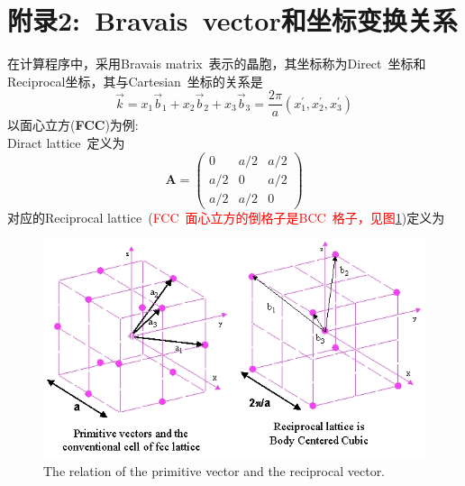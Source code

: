 \documentclass{article}      %
\begin{document}
\section{附录2:~\rm{Bravais~vector}和坐标变换关系}
在计算程序中，采用\textrm{Bravais matrix~}表示的晶胞，其坐标称为\textrm{Direct~}坐标和\textrm{Reciprocal}坐标，其与\textrm{Cartesian~}坐标的关系是
\begin{displaymath}
	\vec k=x_1\vec b_1+x_2\vec b_2+x_3\vec b_3=\frac{2\pi}a(x_1^{\prime},x_2^{\prime},x_3^{\prime})
\end{displaymath}
以面心立方(\textbf{FCC})为例:~\\
\textrm{Diract lattice~}定义为
\begin{displaymath}
	\mathbf{A}=\left(
	\begin{matrix}
		0 &a/2 &a/2\\
		a/2 &0 &a/2\\
		a/2 &a/2 &0
	\end{matrix}\right)
\end{displaymath}
对应的\textrm{Reciprocal lattice~}(\textcolor{red}{\textrm{FCC~}面心立方的倒格子是\textrm{BCC~}格子，见图\ref{Fig:primitive_reciprocal}})定义为
\begin{figure}[h!]
\centering
\includegraphics{Direct-Reciprocal_vector-FCC.png}
\caption{\small The relation of the primitive vector and the reciprocal vector.}%
\label{Fig:primitive_reciprocal}
\end{figure}
\end{document}
